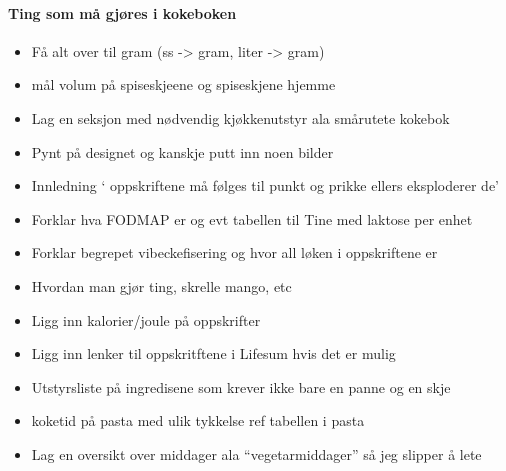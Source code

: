 
\paragraph{Ting som må gjøres i kokeboken}
\begin{itemize}[noitemsep]
  \item Få alt over til gram (ss -> gram, liter -> gram)
  \item mål volum på spiseskjeene og spiseskjene hjemme
  \item Lag en seksjon med nødvendig kjøkkenutstyr ala smårutete kokebok
  \item Pynt på designet og kanskje putt inn noen bilder
  \item Innledning ` oppskriftene må følges til punkt og prikke ellers eksploderer de'
  \item Forklar hva FODMAP er og evt tabellen til Tine med laktose per enhet
  \item Forklar begrepet vibeckefisering og hvor all løken i oppskriftene er
  \item Hvordan man gjør ting, skrelle mango, etc
  \item Ligg inn kalorier/joule på oppskrifter
  \item Ligg inn lenker til oppskritftene i Lifesum hvis det er mulig
  \item Utstyrsliste på ingredisene som krever ikke bare en panne og en skje
  \item koketid på pasta med ulik tykkelse ref tabellen i pasta
  \item Lag en oversikt over middager ala ``vegetarmiddager'' så jeg slipper å lete
\end{itemize}
